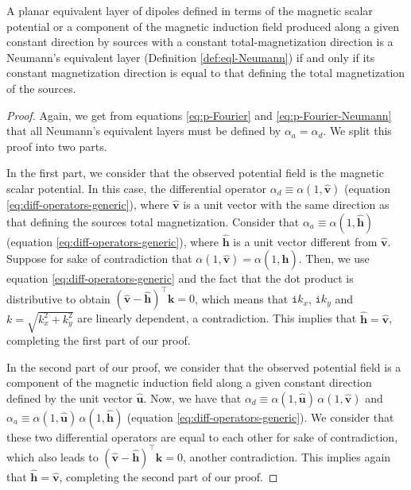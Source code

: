\begin{lemma}
	A planar equivalent layer of dipoles defined in terms of the magnetic scalar potential or a 
	component of the magnetic induction 
	field produced along a given constant direction by sources with a constant total-magnetization direction
	is a Neumann's equivalent layer (Definition \ref{def:eql-Neumann}) 
	if and only if its constant magnetization direction is equal to that defining the total magnetization of the sources.
	\label{lemma:eql-Neumann-dipoles}
\end{lemma}
\begin{proof}
	Again, we get from equations \ref{eq:p-Fourier} and \ref{eq:p-Fourier-Neumann} that all Neumann's 
	equivalent layers must be defined by $\alpha_{a} = \alpha_{d}$.
	We split this proof into two parts.
	
	In the first part, we consider that the observed potential field is the magnetic scalar potential. 
	In this case, the differential operator 
	$\alpha_{d} \equiv \alpha(1, \hat{\mathbf{v}})$ (equation \ref{eq:diff-operators-generic}),
	where $\hat{\mathbf{v}}$ is a unit vector with the same direction as that defining the
	sources total magnetization. Consider that 
	$\alpha_{a} \equiv \alpha(1, \hat{\mathbf{h}})$ (equation \ref{eq:diff-operators-generic}),
	where $\hat{\mathbf{h}}$ is a unit vector different from $\hat{\mathbf{v}}$. Suppose for sake of
	contradiction that $\alpha(1, \hat{\mathbf{v}}) = \alpha(1, \hat{\mathbf{h}})$. Then, we use 
	equation \ref{eq:diff-operators-generic} and the fact that the dot product is distributive to obtain 
	$(\hat{\mathbf{v}} - \hat{\mathbf{h}})^{\top} \mathbf{k} = 0$, which means that $\mathtt{i} k_{x}$, 
	$\mathtt{i} k_{y}$ and $k = \sqrt{k_{x}^{2} + k_{y}^{2}}$ are linearly dependent, a contradiction.
	This implies that $\hat{\mathbf{h}} = \hat{\mathbf{v}}$, completing the first part of our proof.
	
	In the second part of our proof, we consider that the observed potential field is a component
	of the magnetic induction field along a given constant direction defined by the unit vector $\hat{\mathbf{u}}$.
	Now, we have that 
	$\alpha_{d} \equiv \alpha(1, \hat{\mathbf{u}}) \, \alpha(1, \hat{\mathbf{v}})$ and
	$\alpha_{a} \equiv \alpha(1, \hat{\mathbf{u}}) \, \alpha(1, \hat{\mathbf{h}})$ 
	(equation \ref{eq:diff-operators-generic}). We consider that these two differential operators
	are equal to each other for sake of contradiction, which also leads to
	$(\hat{\mathbf{v}} - \hat{\mathbf{h}})^{\top} \mathbf{k} = 0$, another contradiction.
	This implies again that $\hat{\mathbf{h}} = \hat{\mathbf{v}}$, completing the second part of our proof.
\end{proof}

